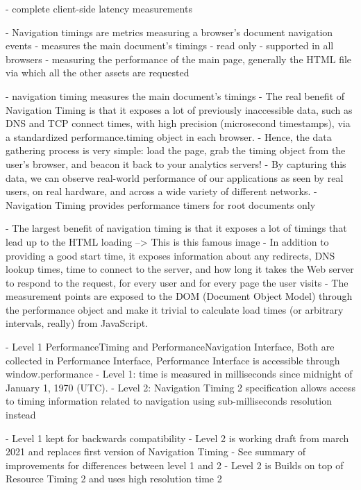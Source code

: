 - complete client-side latency measurements


- Navigation timings are metrics measuring a browser's document navigation events
- measures the main document's timings
- read only
- supported in all browsers
- measuring the performance of the main page, generally the HTML file via which all the other assets are requested



- navigation timing measures the main document's timings
- The real benefit of Navigation Timing is that it exposes a lot of previously inaccessible data, such as DNS and TCP connect times, with high precision (microsecond timestamps), via a standardized performance.timing object in each browser.
- Hence, the data gathering process is very simple: load the page, grab the timing object from the user’s browser, and beacon it back to your analytics servers!
- By capturing this data, we can observe real-world performance of our applications as seen by real users, on real hardware, and across a wide variety of different networks.
- Navigation Timing provides performance timers for root documents only


- The largest benefit of navigation timing is that it exposes a lot of timings that lead up to the HTML loading --> This is this famous image
- In addition to providing a good start time, it exposes information about any redirects, DNS lookup times, time to connect to the server, and how long it takes the Web server to respond to the request, for every user and for every page the user visits
- The measurement points are exposed to the DOM (Document Object Model) through the performance object and make it trivial to calculate load times (or arbitrary intervals, really) from JavaScript.




- Level 1 PerformanceTiming and PerformanceNavigation Interface, Both are collected in Performance Interface, Performance Interface is accessible through window.performance
- Level 1: time is measured in milliseconds since midnight of January 1, 1970 (UTC).
- Level 2: Navigation Timing 2 specification allows access to timing information related to navigation using sub-milliseconds resolution instead


- Level 1 kept for backwards compatibility
- Level 2 is working draft from march 2021 and replaces first version of Navigation Timing
- See summary of improvements for differences between level 1 and 2
- Level 2 is Builds on top of Resource Timing 2 and uses high resolution time 2


